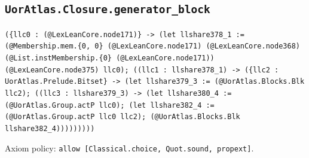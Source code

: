 \documentclass[11pt]{article}
\begin{document}
\subsection*{\texttt{UorAtlas.Closure.generator\_block}}
\noindent\texttt{(\{llc0 : (@LexLeanCore.node171)\} -> (let llshare378\_1 := (@Membership.mem.\{0, 0\} (@LexLeanCore.node171) (@LexLeanCore.node368) (@List.instMembership.\{0\} (@LexLeanCore.node171)) (@LexLeanCore.node375) llc0); ((llc1 : llshare378\_1) -> (\{llc2 : UorAtlas.Prelude.Bitset\} -> (let llshare379\_3 := (@UorAtlas.Blocks.Blk llc2); ((llc3 : llshare379\_3) -> (let llshare380\_4 := (@UorAtlas.Group.actP llc0); (let llshare382\_4 := (@UorAtlas.Group.actP llc0 llc2); (@UorAtlas.Blocks.Blk llshare382\_4)))))))))}\par
\noindent Axiom policy: \texttt{allow [Classical.choice, Quot.sound, propext]}.\par
\end{document}
